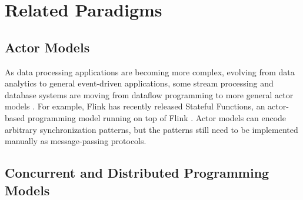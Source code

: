 \section{Related Paradigms}

\subsection{Actor Models}

As data processing applications are becoming more complex, evolving from
data analytics to general event-driven applications, some stream
processing and database systems are moving from dataflow programming to more
general actor models
\cite{CarboneFKK20,Bernstein19,BernsteinDKM17,Das2018,xu2021move}.
For example, Flink has recently released Stateful Functions,
an actor-based programming model running on top of Flink
\cite{AkhterFK19,StatefulFunctions}.
Actor models can encode arbitrary synchronization patterns,
but the patterns still need to be implemented manually as
message-passing protocols.

\subsection{Concurrent and Distributed Programming Models}

